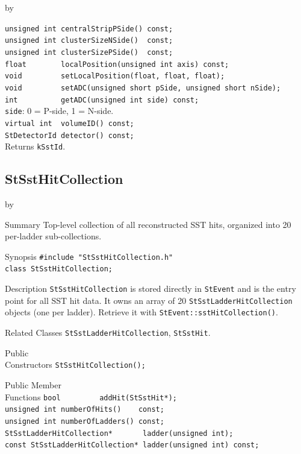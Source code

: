 \documentclass[twoside]{article}
\newcommand{\entrylabel}[1]{\mbox{\textbf{{#1}}}\hfil}%
\newenvironment{entry}
{\begin{list}{}%
    {\renewcommand{\makelabel}{\entrylabel}%
     \setlength{\labelwidth}{90pt}%
     \setlength{\leftmargin}{\labelwidth}
     \advance\leftmargin by \labelsep%
      }%
    }%
  {\end{list}}
\newcommand{\Entrylabel}[1]%
{\raisebox{0pt}[1ex][0pt]{\makebox[\labelwidth][l]%
    {\parbox[t]{\labelwidth}{\hspace{0pt}\textbf{{#1}}}}}}
\newenvironment{Entry}%
{\renewcommand{\entrylabel}{\Entrylabel}\begin{entry}}%
  {\end{entry}}
\begin{document}
\begin{Entry}
    \verb+unsigned int centralStripPSide() const;+\\
    \verb+unsigned int clusterSizeNSide()  const;+\\
    \verb+unsigned int clusterSizePSide()  const;+\\
    \verb+float        localPosition(unsigned int axis) const;+\\
    \verb+void         setLocalPosition(float, float, float);+\\
    \verb+void         setADC(unsigned short pSide, unsigned short nSide);+\\
    \verb+int          getADC(unsigned int side) const;+\\
    \quad \verb+side+: 0 = P-side, 1 = N-side.\\
    \verb+virtual int  volumeID() const;+\\
    \verb+StDetectorId detector() const;+\\
    \quad Returns \verb+kSstId+.\\
\end{Entry}
\clearpage

\subsection{StSstHitCollection}
\label{sec:StSstHitCollection}
\begin{Entry}
\item[Summary] Top-level collection of all reconstructed SST hits, organized
    into 20 per-ladder sub-collections.
\item[Synopsis]
    \verb+#include "StSstHitCollection.h"+\\
    \verb+class StSstHitCollection;+\\
\item[Description]
    \texttt{StSstHitCollection} is stored directly in \texttt{StEvent} and is
    the entry point for all SST hit data.  It owns an array of 20
    \texttt{StSstLadderHitCollection} objects (one per ladder).
    Retrieve it with \verb+StEvent::sstHitCollection()+.
\item[Related Classes]
    \texttt{StSstLadderHitCollection}, \texttt{StSstHit}.
\item[Public\\ Constructors]
    \verb+StSstHitCollection();+\\
\item[Public Member\\ Functions]
    \verb+bool         addHit(StSstHit*);+\\
    \verb+unsigned int numberOfHits()    const;+\\
    \verb+unsigned int numberOfLadders() const;+\\
    \verb+StSstLadderHitCollection*       ladder(unsigned int);+\\
    \verb+const StSstLadderHitCollection* ladder(unsigned int) const;+\\
\end{Entry}
\clearpage
\end{document}
